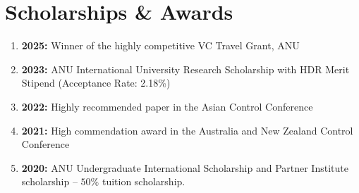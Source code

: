 \section{Scholarships \& Awards}
\begin{enumerate}\itemsep0em
    \item \textbf{2025:} Winner of the highly competitive VC Travel Grant, ANU
    \item \textbf{2023:} ANU International University Research Scholarship with HDR Merit Stipend (Acceptance Rate: 2.18\%)
    \item \textbf{2022:} Highly recommended paper in the Asian Control Conference
    \item \textbf{2021:} High commendation award in the Australia and New Zealand Control Conference
    \item \textbf{2020:} ANU Undergraduate International Scholarship and Partner Institute scholarship -- $50\%$ tuition scholarship.
\end{enumerate}
